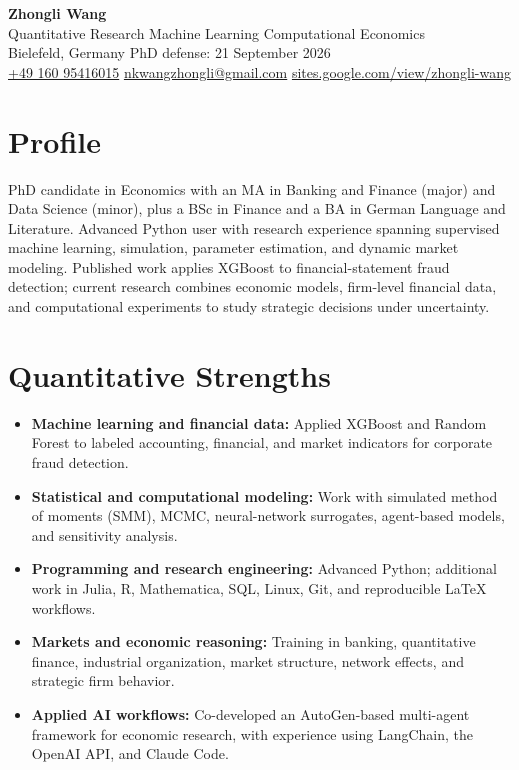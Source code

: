 \documentclass[a4paper,11pt]{article}
\begin{document}
\begin{center}
  {\LARGE\textbf{\textcolor{accent}{Zhongli Wang}}}\\[3pt]
  {\large Quantitative Research \textbar{} Machine Learning \textbar{} Computational Economics}\\[3pt]
  Bielefeld, Germany \textbar{} PhD defense: 21 September 2026\\[2pt]
  \href{tel:+4916095416015}{+49 160 95416015} \textbar{}
  \href{mailto:nkwangzhongli@gmail.com}{nkwangzhongli@gmail.com} \textbar{}
  \href{https://sites.google.com/view/zhongli-wang/}{sites.google.com/view/zhongli-wang}
\end{center}

\section{Profile}
PhD candidate in Economics with an MA in Banking and Finance (major) and Data Science (minor), plus a BSc in Finance and a BA in German Language and Literature. Advanced Python user with research experience spanning supervised machine learning, simulation, parameter estimation, and dynamic market modeling. Published work applies XGBoost to financial-statement fraud detection; current research combines economic models, firm-level financial data, and computational experiments to study strategic decisions under uncertainty.

\section{Quantitative Strengths}
\begin{itemize}
  \item \textbf{Machine learning and financial data:} Applied XGBoost and Random Forest to labeled accounting, financial, and market indicators for corporate fraud detection.
  \item \textbf{Statistical and computational modeling:} Work with simulated method of moments (SMM), MCMC, neural-network surrogates, agent-based models, and sensitivity analysis.
  \item \textbf{Programming and research engineering:} Advanced Python; additional work in Julia, R, Mathematica, SQL, Linux, Git, and reproducible LaTeX workflows.
  \item \textbf{Markets and economic reasoning:} Training in banking, quantitative finance, industrial organization, market structure, network effects, and strategic firm behavior.
  \item \textbf{Applied AI workflows:} Co-developed an AutoGen-based multi-agent framework for economic research, with experience using LangChain, the OpenAI API, and Claude Code.
\end{itemize}
\end{document}
